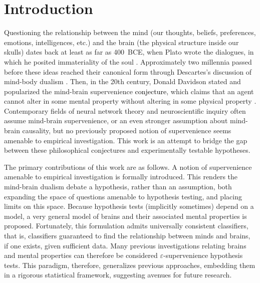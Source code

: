 \documentclass{article}
\newcommand{\eps}{\varepsilon}
\providecommand{\tr}[1]{\textcolor{black}{#1}}
\begin{document}


\section{Introduction}

Questioning the relationship between the mind (our thoughts, beliefs, preferences, emotions, intelligences, etc.) and the brain (the physical structure inside our skulls) dates back at least as far as 400~BCE, when Plato wrote the dialogues, in which he posited immateriality of the soul \cite{Plato97}. Approximately two millennia passed before these ideas reached their canonical form through Descartes's discussion of mind-body dualism \cite{Descartes1641}. Then, in the 20th century, Donald Davidson stated and popularized the mind-brain supervenience \tr{conjecture}, which claims that an agent cannot alter in some mental property without altering in some physical property \cite{Davidson70}. Contemporary fields of neural network theory and neuroscientific inquiry often assume mind-brain supervenience, or an even stronger assumption about mind-brain causality, but no previously proposed notion of supervenience seems amenable to empirical investigation. This work is an attempt to bridge the gap between these philosophical conjectures and experimentally testable hypotheses. %

The primary contributions of this work are as follows.  A notion of supervenience amenable to empirical investigation is formally introduced.  This renders the mind-brain dualism debate a hypothesis, rather than an assumption, both expanding the space of questions amenable to hypothesis testing, and placing limits on this space.  Because hypothesis tests (implicitly sometimes) depend on a model, a very general model of brains and their associated mental properties is proposed.  Fortunately, this formulation admits universally consistent classifiers, that is, classifiers guaranteed to find the relationship between minds and brains, if one exists, given sufficient data.  Many previous investigations relating brains and mental properties can therefore be considered $\eps$-supervenience hypothesis tests.  This paradigm, therefore, generalizes previous approaches, embedding them in a rigorous statistical framework, suggesting avenues for future research.
\end{document}
